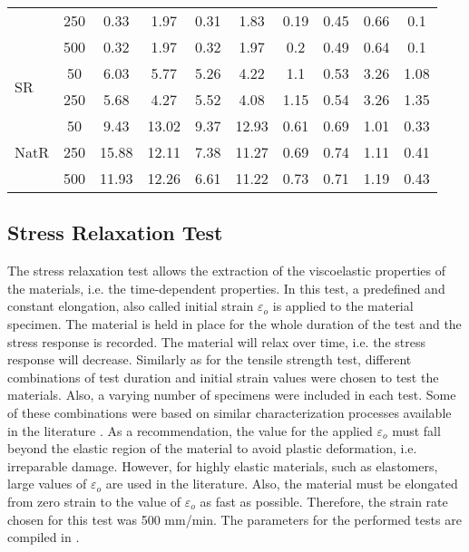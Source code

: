 \begin{table*}[htb!]
\begin{tabular}{lccccccccc}
                           & 250   & 0.33       & 1.97       & 0.31    & 1.83    & 0.19    & 0.45    & 0.66     & 0.1       \\
                           & 500   & 0.32       & 1.97       & 0.32    & 1.97    & 0.2     & 0.49    & 0.64     & 0.1       \\
\hline
\multirow{2}{*}{SR}      & 50    & 6.03       & 5.77       & 5.26    & 4.22    & 1.1     & 0.53    & 3.26     & 1.08      \\
                           & 250   & 5.68       & 4.27       & 5.52    & 4.08    & 1.15    & 0.54    & 3.26     & 1.35      \\
\hline
\multirow{3}{*}{NatR} & 50    & 9.43       & 13.02      & 9.37    & 12.93   & 0.61    & 0.69    & 1.01     & 0.33      \\
                           & 250   & 15.88      & 12.11      & 7.38    & 11.27   & 0.69    & 0.74    & 1.11     & 0.41      \\
                           & 500   & 11.93      & 12.26      & 6.61    & 11.22   & 0.73    & 0.71    & 1.19     & 0.43     \\
\bottomrule
\end{tabular}
\end{table*}


\subsection{Stress Relaxation Test}

The stress relaxation test allows the extraction of the viscoelastic properties of the materials, i.e. the time-dependent properties. In this test, a predefined and constant elongation, also called initial strain $\varepsilon_o$ is applied to the material specimen. The material is held in place for the whole duration of the test and the stress response is recorded. The material will relax over time, i.e. the stress response will decrease. Similarly as for the tensile strength test, different combinations of test duration and initial strain values were chosen to test the materials. Also, a varying number of specimens were included in each test. Some of these combinations were based on similar characterization processes available in the literature \cite{case2015soft,delin1995volume}. As a recommendation, the value for the applied $\varepsilon_o$ must fall beyond the elastic region of the material to avoid plastic deformation, i.e. irreparable damage. However, for highly elastic materials, such as elastomers, large values of $\varepsilon_o$ are used in the literature. Also, the material must be elongated from zero strain to the value of $\varepsilon_o$ as fast as possible. Therefore, the strain rate chosen for this test was  500 mm/min. The parameters for the performed tests are compiled in .

